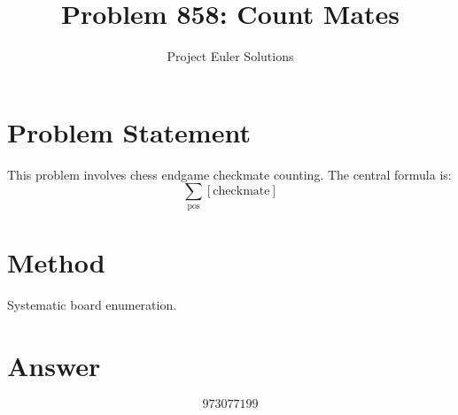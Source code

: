 \documentclass[11pt]{article}
\title{Problem 858: Count Mates}
\author{Project Euler Solutions}
\date{}
\begin{document}
\maketitle
\section{Problem Statement}
This problem involves chess endgame checkmate counting. The central formula is:
\[
\sum_{\text{pos}} [\text{checkmate}]
\]
\section{Method}
Systematic board enumeration.
\section{Answer}

\[
\boxed{973077199}
\]
\end{document}
